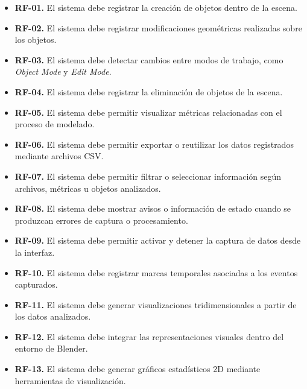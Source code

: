 \begin{itemize}
    \item \textbf{RF-01.} El sistema debe registrar la creación de objetos dentro de la escena.

    \item \textbf{RF-02.} El sistema debe registrar modificaciones geométricas realizadas sobre los objetos.

    \item \textbf{RF-03.} El sistema debe detectar cambios entre modos de trabajo, como \textit{Object Mode} y \textit{Edit Mode}.

    \item \textbf{RF-04.} El sistema debe registrar la eliminación de objetos de la escena.

    \item \textbf{RF-05.} El sistema debe permitir visualizar métricas relacionadas con el proceso de modelado.

    \item \textbf{RF-06.} El sistema debe permitir exportar o reutilizar los datos registrados mediante archivos CSV.

    \item \textbf{RF-07.} El sistema debe permitir filtrar o seleccionar información según archivos, métricas u objetos analizados.

    \item \textbf{RF-08.} El sistema debe mostrar avisos o información de estado cuando se produzcan errores de captura o procesamiento.

    \item \textbf{RF-09.} El sistema debe permitir activar y detener la captura de datos desde la interfaz.

    \item \textbf{RF-10.} El sistema debe registrar marcas temporales asociadas a los eventos capturados.

    \item \textbf{RF-11.} El sistema debe generar visualizaciones tridimensionales a partir de los datos analizados.

    \item \textbf{RF-12.} El sistema debe integrar las representaciones visuales dentro del entorno de Blender.

    \item \textbf{RF-13.} El sistema debe generar gráficos estadísticos 2D mediante herramientas de visualización.
\end{itemize}

